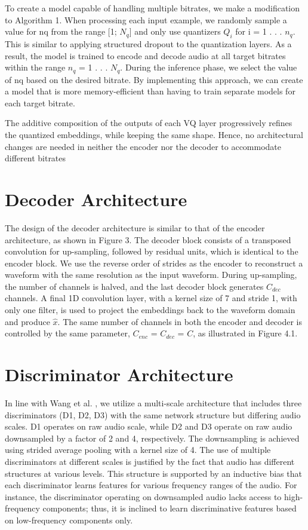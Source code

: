 \documentclass[12pt]{report}
\begin{document}
To create a model capable of handling multiple bitrates, we make a modification to Algorithm 1. When processing each input example, we randomly sample a value for nq from the range [1; $N_q$] and only use quantizers $Q_i$ for i = 1 . . . $n_q$. This is similar to applying structured dropout to the quantization layers. As a result, the model is trained to encode and decode audio at all target bitrates within the range $n_q$ = 1 . . . $N_q$. During the inference phase, we select the value of nq based on the desired bitrate. By implementing this approach, we can create a model that is more memory-efficient than having to train separate models for each target bitrate.

The additive composition of the outputs of each VQ layer progressively refines the quantized embeddings, while keeping the same shape. Hence, no architectural changes are needed in neither the encoder nor the decoder to accommodate different bitrates
\section{Decoder Architecture}
The design of the decoder architecture is similar to that of the encoder architecture, as shown in Figure 3. The decoder block consists of a transposed convolution for up-sampling, followed by residual units, which is identical to the encoder block. We use the reverse order of strides as the encoder to reconstruct a waveform with the same resolution as the input waveform. During up-sampling, the number of channels is halved, and the last decoder block generates $C_{dec}$ channels. A final 1D convolution layer, with a kernel size of 7 and stride 1, with only one filter, is used to project the embeddings back to the waveform domain and produce $\hat{x}$. The same number of channels in both the encoder and decoder is controlled by the same parameter, $C_{enc}$ = $C_{dec}$ = $C$, as illustrated in Figure 4.1.
\section{Discriminator Architecture}
In line with Wang et al. \cite{wang2018high}, we utilize a multi-scale architecture that includes three discriminators (D1, D2, D3) with the same network structure but differing audio scales. D1 operates on raw audio scale, while D2 and D3 operate on raw audio downsampled by a factor of 2 and 4, respectively. The downsampling is achieved using strided average pooling with a kernel size of 4. The use of multiple discriminators at different scales is justified by the fact that audio has different structures at various levels. This structure is supported by an inductive bias that each discriminator learns features for various frequency ranges of the audio. For instance, the discriminator operating on downsampled audio lacks access to high-frequency components; thus, it is inclined to learn discriminative features based on low-frequency components only.
\end{document}
